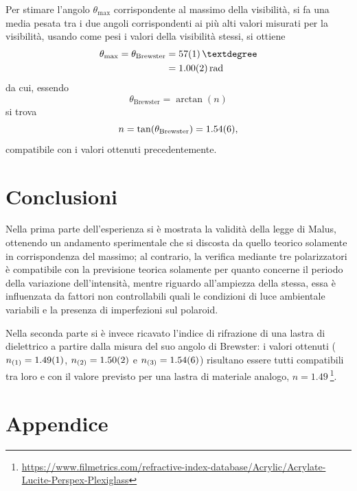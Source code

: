 \documentclass[10pt,oneside,a4paper]{article}
\newenvironment{Figure}
  {\par\medskip\noindent\minipage{\linewidth}}
  {\endminipage\par\medskip}
\begin{document}
\begin{multicols}{2}
\begin{Figure}
\begin{center}
	\label{fig:brewster_V}
	\end{center}
\end{Figure}
Per stimare l'angolo $\theta_\mathrm{max}$ corrispondente al massimo della visibilità, si fa una media pesata tra i due angoli corrispondenti ai più alti valori misurati per la visibilità, usando come pesi i valori della visibilità stessi, si ottiene
\begin{align}
	\theta_\mathrm{max} = \theta_\mathrm{Brewster} &= \SI{57 \pm 1}{°} \\ &= \SI{1.00 \pm 0.02}{\mathrm{rad}}
\end{align}
da cui, essendo 
\begin{equation}
	\theta_\mathrm{Brewster} = \arctan (n)
\end{equation}
si trova 
\begin{equation}
	n = \tan (\theta_\mathrm{Brewster} )= \SI{1.54 \pm 0.06}{},
\end{equation}
compatibile con i valori ottenuti precedentemente.

\section{Conclusioni}
Nella prima parte dell'esperienza si è mostrata la validità della legge di Malus, ottenendo un andamento sperimentale che si discosta da quello teorico solamente in corrispondenza del massimo; al contrario, la verifica mediante tre polarizzatori è compatibile con la previsione teorica solamente per quanto concerne il periodo della variazione dell'intensità, mentre riguardo all'ampiezza della stessa, essa è influenzata da fattori non controllabili quali le condizioni di luce ambientale variabili e la presenza di imperfezioni sul polaroid.

Nella seconda parte si è invece ricavato l'indice di rifrazione di una lastra di dielettrico a partire dalla misura del suo angolo di Brewster: i valori ottenuti ($n_{(1)} = \SI{1.49 \pm 0.01}{}$, $n_{(2)} = \SI{1.50 \pm 0.02}{}$ e $n_{(3)} = \SI{1.54 \pm 0.06}{}$) risultano essere tutti compatibili tra loro e con il valore previsto per una lastra di materiale analogo, $n = \SI{1.49}{}$\footnote{\url{https://www.filmetrics.com/refractive-index-database/Acrylic/Acrylate-Lucite-Perspex-Plexiglass}}.


\end{multicols}

\section{Appendice}
\end{document}
